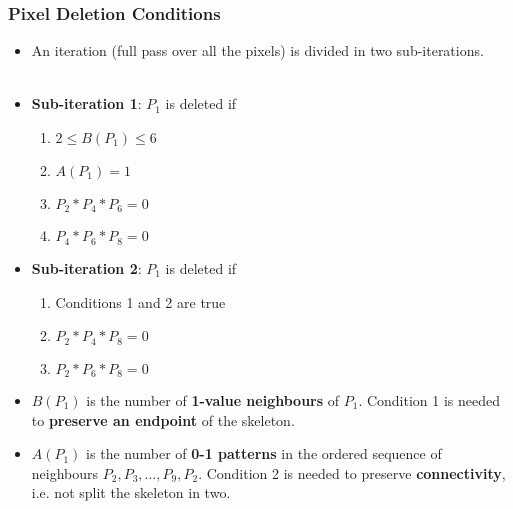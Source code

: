 \begin{frame}
  \frametitle{Pixel Deletion Conditions}
  \begin{itemize}
    \item An iteration (full pass over all the pixels) is divided in two sub-iterations.
          \\~\\
    \item \textbf{Sub-iteration 1}: $P_1$ is deleted if
          \begin{enumerate}
            \item $2 \leq B(P_1) \leq 6$
            \item $A(P_1) = 1$
            \item $P_2 * P_4 * P_6 = 0$
            \item $P_4 * P_6 * P_8 = 0$
          \end{enumerate}
          \vspace{0.3cm}
    \item \textbf{Sub-iteration 2}: $P_1$ is deleted if
          \begin{enumerate}
            \item Conditions 1 and 2 are true
            \item $P_2 * P_4 * P_8 = 0$
            \item $P_2 * P_6 * P_8 = 0$
          \end{enumerate}
          \vspace{0.3cm}
    \item $B(P_1)$ is the number of \textbf{1-value neighbours} of $P_1$. Condition 1 is needed to \textbf{preserve an endpoint} of the skeleton.
    \item $A(P_1)$ is the number of \textbf{0-1 patterns} in the ordered sequence of neighbours $P_2, P_3, \dots, P_9, P_2$. Condition 2 is needed to preserve \textbf{connectivity}, i.e. not split the skeleton in two.
  \end{itemize}
\end{frame}

